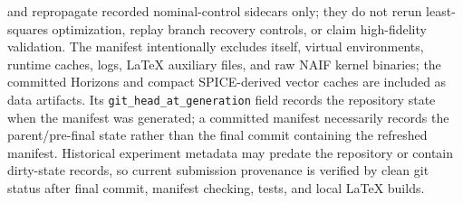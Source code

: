 \documentclass[11pt]{article}
\begin{document}
 and  repropagate recorded nominal-control sidecars only; they do not rerun least-squares optimization, replay branch recovery controls, or claim high-fidelity validation. The manifest intentionally excludes itself, virtual environments, runtime caches, logs, LaTeX auxiliary files, and raw NAIF kernel binaries; the committed Horizons and compact SPICE-derived vector caches are included as data artifacts. Its \texttt{git\_head\_at\_generation} field records the repository state when the manifest was generated; a committed manifest necessarily records the parent/pre-final state rather than the final commit containing the refreshed manifest. Historical experiment metadata may predate the repository or contain dirty-state records, so current submission provenance is verified by clean git status after final commit, manifest checking, tests, and local LaTeX builds.
\end{document}
